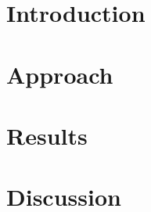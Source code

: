 \documentclass{amsart}
\begin{document}


\tableofcontents

\section{Introduction}

\section{Approach}

\section{Results}

\section{Discussion}

\end{document}
